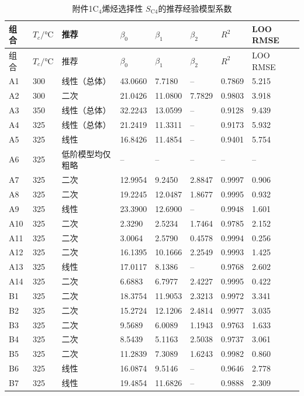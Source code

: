 \begin{longtable}{C{0.06\textwidth}C{0.10\textwidth}L{0.15\textwidth}C{0.10\textwidth}C{0.10\textwidth}C{0.10\textwidth}C{0.08\textwidth}C{0.11\textwidth}}
\caption{附件1$\mathrm{C}_4$烯烃选择性 $S_{\mathrm{C4}}$的推荐经验模型系数}\label{tab:q1-selectivity-recommended}\\
\toprule
组合 & $T_c/\si{\degreeCelsius}$ & 推荐 & $\beta_0$ & $\beta_1$ & $\beta_2$ & $R^2$ & LOO RMSE \\
\midrule
\endfirsthead
\toprule
组合 & $T_c/\si{\degreeCelsius}$ & 推荐 & $\beta_0$ & $\beta_1$ & $\beta_2$ & $R^2$ & LOO RMSE \\
\midrule
\endhead
A1 & 300 & 线性（总体） & 43.0660 & 7.7180 & -- & 0.7869 & 5.215 \\
A2 & 300 & 二次 & 21.0426 & 11.0800 & 7.7829 & 0.9803 & 3.918 \\
A3 & 350 & 线性（总体） & 32.2243 & 13.0599 & -- & 0.9128 & 9.439 \\
A4 & 325 & 线性（总体） & 21.2419 & 11.3311 & -- & 0.9173 & 5.932 \\
A5 & 325 & 线性 & 16.8426 & 11.4854 & -- & 0.9401 & 5.754 \\
A6 & 325 & 低阶模型均仅粗略 & -- & -- & -- & -- & -- \\
A7 & 325 & 二次 & 12.9954 & 9.2450 & 2.8847 & 0.9997 & 0.906 \\
A8 & 325 & 二次 & 19.2245 & 12.0487 & 1.8677 & 0.9995 & 0.932 \\
A9 & 325 & 线性 & 23.3900 & 12.6900 & -- & 0.9948 & 1.601 \\
A10 & 325 & 二次 & 2.3290 & 2.5234 & 1.7464 & 0.9785 & 2.152 \\
A11 & 325 & 二次 & 3.0064 & 2.5790 & 0.4578 & 0.9994 & 0.256 \\
A12 & 325 & 二次 & 16.1395 & 10.1666 & 2.2549 & 0.9993 & 1.425 \\
A13 & 325 & 线性 & 17.0117 & 8.1386 & -- & 0.9768 & 2.602 \\
A14 & 325 & 二次 & 6.6883 & 6.7977 & 2.4227 & 0.9995 & 0.422 \\
B1 & 325 & 二次 & 18.3754 & 11.9053 & 2.3213 & 0.9972 & 3.341 \\
B2 & 325 & 二次 & 15.2724 & 12.1206 & 2.4814 & 0.9977 & 3.035 \\
B3 & 325 & 二次 & 9.5689 & 6.0089 & 1.1943 & 0.9763 & 1.633 \\
B4 & 325 & 二次 & 8.5439 & 5.1163 & 2.5038 & 0.9737 & 3.061 \\
B5 & 325 & 二次 & 11.2839 & 7.3089 & 1.6243 & 0.9982 & 0.860 \\
B6 & 325 & 线性 & 16.0874 & 9.5146 & -- & 0.9646 & 2.778 \\
B7 & 325 & 线性 & 19.4854 & 11.6826 & -- & 0.9888 & 2.309 \\
\bottomrule
\end{longtable}
